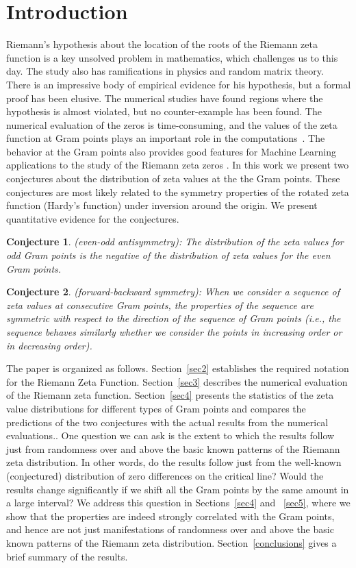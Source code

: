 \documentclass[twoside]{article}
\newtheorem{mydef}{Conjecture}
\begin{document}
\section{Introduction}
Riemann's hypothesis about the location of 
the roots of the Riemann zeta function is a key unsolved problem in mathematics,
which challenges us to this day. The study also has ramifications in physics and
random matrix theory. 
There is an impressive body of empirical evidence for his hypothesis,
but a formal proof has been elusive. The numerical studies have found
regions where the hypothesis is almost violated, but no counter-example has
been found. The numerical evaluation of the zeros is time-consuming, and the values of the 
zeta function at Gram points plays an important role in the computations~\cite{korolev1,korolev2}.  The behavior at the Gram points also provides good features for  Machine Learning applications to the study of the Riemann zeta zeros \cite{osneural,osentropy}.  In 
this work we present two conjectures about the distribution of zeta values at the 
the Gram points. These conjectures are most likely related to the symmetry properties of the rotated zeta function (Hardy's function) under inversion around the origin. We present quantitative evidence for the conjectures. 

\begin{mydef}\label{antisymmetry}
(even-odd antisymmetry): The distribution of the zeta values for odd Gram points is the negative of the distribution of zeta values for the even Gram points.
\end{mydef}
\begin{mydef}\label{symmetry}
(forward-backward symmetry): When we consider a sequence of zeta values at consecutive Gram points, the properties of the sequence are symmetric with respect to the direction of the sequence of Gram points (i.e., the sequence behaves similarly whether we consider the points in increasing order or in decreasing order).
\end{mydef}

The paper is organized as follows.
Section~\ref{sec2} establishes the required notation for the 
Riemann Zeta Function. 
Section~\ref{sec3} describes the numerical evaluation of the Riemann zeta function. 
Section~\ref{sec4} presents the statistics of the zeta value distributions for different types of Gram points and compares the predictions of the two conjectures with the actual results from the numerical evaluations.. 
One question we can ask is the extent to which the results follow just from randomness over and above the basic known patterns of the Riemann zeta distribution. In other words, do the results follow just from the well-known (conjectured) distribution of zero differences on the critical line? Would the results change significantly if we shift all the Gram points  by the same amount in a large interval? We address this question in Sections~\ref{sec4} and ~\ref{sec5}, where we show that the properties are indeed strongly correlated with the Gram points, and hence are not just manifestations of randomness over and above the basic known patterns of the Riemann zeta distribution.
Section~\ref{conclusions} gives a brief summary of the results. 
\end{document}
